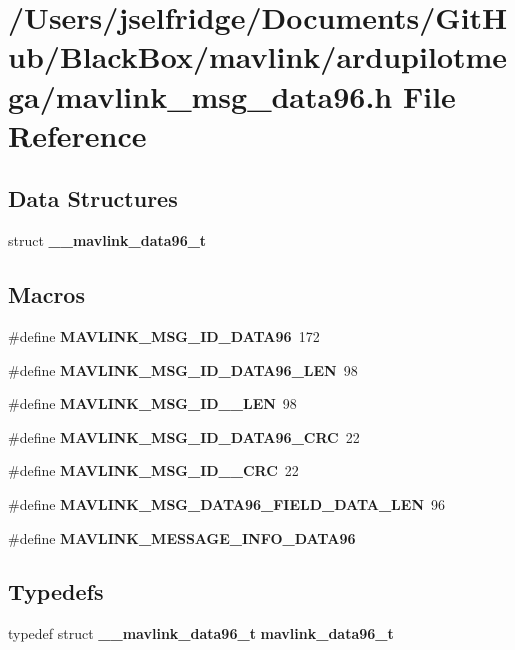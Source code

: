 \section{/\+Users/jselfridge/\+Documents/\+Git\+Hub/\+Black\+Box/mavlink/ardupilotmega/mavlink\+\_\+msg\+\_\+data96.h File Reference}
\label{mavlink__msg__data96_8h}
\subsection*{Data Structures}
\begin{DoxyCompactItemize}
\item 
struct \textbf{ \+\_\+\+\_\+mavlink\+\_\+data96\+\_\+t}
\end{DoxyCompactItemize}
\subsection*{Macros}
\begin{DoxyCompactItemize}
\item 
\#define \textbf{ M\+A\+V\+L\+I\+N\+K\+\_\+\+M\+S\+G\+\_\+\+I\+D\+\_\+\+D\+A\+T\+A96}~172
\item 
\#define \textbf{ M\+A\+V\+L\+I\+N\+K\+\_\+\+M\+S\+G\+\_\+\+I\+D\+\_\+\+D\+A\+T\+A96\+\_\+\+L\+EN}~98
\item 
\#define \textbf{ M\+A\+V\+L\+I\+N\+K\+\_\+\+M\+S\+G\+\_\+\+I\+D\+\_\+\_\+\+L\+EN}~98
\item 
\#define \textbf{ M\+A\+V\+L\+I\+N\+K\+\_\+\+M\+S\+G\+\_\+\+I\+D\+\_\+\+D\+A\+T\+A96\+\_\+\+C\+RC}~22
\item 
\#define \textbf{ M\+A\+V\+L\+I\+N\+K\+\_\+\+M\+S\+G\+\_\+\+I\+D\+\_\+\_\+\+C\+RC}~22
\item 
\#define \textbf{ M\+A\+V\+L\+I\+N\+K\+\_\+\+M\+S\+G\+\_\+\+D\+A\+T\+A96\+\_\+\+F\+I\+E\+L\+D\+\_\+\+D\+A\+T\+A\+\_\+\+L\+EN}~96
\item 
\#define \textbf{ M\+A\+V\+L\+I\+N\+K\+\_\+\+M\+E\+S\+S\+A\+G\+E\+\_\+\+I\+N\+F\+O\+\_\+\+D\+A\+T\+A96}
\end{DoxyCompactItemize}
\subsection*{Typedefs}
\begin{DoxyCompactItemize}
\item 
typedef struct \textbf{ \+\_\+\+\_\+mavlink\+\_\+data96\+\_\+t} \textbf{ mavlink\+\_\+data96\+\_\+t}
\end{DoxyCompactItemize}


